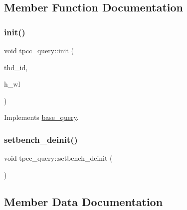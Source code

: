 \subsection{Member Function Documentation}
\mbox{\label{classtpcc__query_a0bb03655040cf0f96ee0601c02c8876f}} 
\subsubsection{\texorpdfstring{init()}{init()}}
{\footnotesize\ttfamily void tpcc\+\_\+query\+::init (\begin{DoxyParamCaption}\item[{uint64\+\_\+t}]{thd\+\_\+id,  }\item[{\hyperlink{classworkload}{workload} $\ast$}]{h\+\_\+wl }\end{DoxyParamCaption})\hspace{0.3cm}{\ttfamily [virtual]}}



Implements \hyperlink{classbase__query_a341a99285c6e849eae1c5a83485335f3}{base\+\_\+query}.

\mbox{\label{classtpcc__query_ae75736a30ca9792473454a4bae82b007}} 
\subsubsection{\texorpdfstring{setbench\+\_\+deinit()}{setbench\_deinit()}}
{\footnotesize\ttfamily void tpcc\+\_\+query\+::setbench\+\_\+deinit (\begin{DoxyParamCaption}{ }\end{DoxyParamCaption})}



\subsection{Member Data Documentation}
\mbox{\label{classtpcc__query_a77bad57f4a3e32c56005d9217bc165fc}} 
